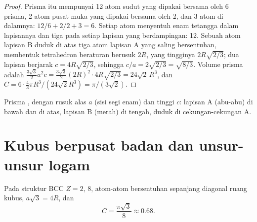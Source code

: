 \begin{proof}
Prisma itu mempunyai 12 atom sudut yang dipakai bersama oleh 6 prisma,
2 atom pusat muka yang dipakai bersama oleh 2, dan 3 atom di dalamnya:
$12/6 + 2/2 + 3 = 6$. Setiap atom menyentuh enam tetangga dalam
lapisannya dan tiga pada setiap lapisan yang berdampingan: 12. Sebuah atom
lapisan B duduk di atas tiga atom lapisan A yang saling bersentuhan,
membentuk tetrahedron beraturan berusuk $2R$, yang tingginya
$2R\sqrt{2/3}$; dua lapisan berjarak $c = 4R\sqrt{2/3}$, sehingga
$c/a = 2\sqrt{2/3} = \sqrt{8/3}$. Volume prisma adalah
$\frac{3\sqrt3}{2}a^2 c = \frac{3\sqrt3}{2}(2R)^2 \cdot
4R\sqrt{2/3} = 24\sqrt2\,R^3$, dan $C = 6 \cdot \frac43\pi R^3/(24\sqrt2
R^3) = \pi/(3\sqrt2)$.
\end{proof}

\begin{omfigure}

{\small Prisma , dengan rusuk alas $a$ (sisi segi enam)
dan tinggi $c$: lapisan A (abu-abu) di bawah dan di atas, lapisan B
(merah) di tengah, duduk di cekungan-cekungan A.}
\end{omfigure}

\section{Kubus berpusat badan dan unsur-unsur logam}

\begin{proposition}\label{prop:b1:crystals-metals:bcc}
Pada struktur BCC $Z = 2$,  8, atom-atom
bersentuhan sepanjang diagonal ruang kubus, $a\sqrt3 = 4R$, dan
\[
  C = \frac{\pi\sqrt3}{8} \approx 0.68 .
\]
\end{proposition}


